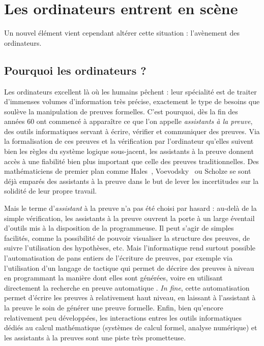 \section{Les ordinateurs entrent en scène}
\label{sec:assistants-preuve}

Un nouvel élément vient cependant altérer cette situation :
l’avènement des ordinateurs.

\subsection{Pourquoi les ordinateurs ?}

Les ordinateurs excellent là où les humains pêchent : leur spécialité est de traiter
d’immenses volumes d’information très précise, exactement le type
de besoins que soulève la manipulation de preuves formelles. C’est pourquoi, dès
la fin des années 60
ont commencé à apparaître ce que l’on appelle \emph{assistants à la
preuve}, des outils informatiques servant à écrire, vérifier et communiquer des
preuves.
Via la formalisation de ces preuves et la vérification par l’ordinateur qu’elles
suivent bien les règles du système logique sous-jacent, les assistants à la preuve
donnent accès à une fiabilité bien plus important que celle des preuves
traditionnelles. Des mathématiciens de premier plan comme
Hales~,
Voevodsky~\cite{??} ou
Scholze \cite{LiquidTensorExperiment}
se sont déjà emparés des assistants à la preuve dans le but de lever les incertitudes
sur la solidité de leur propre travail.

Mais le terme d’\emph{assistant} à la preuve n’a pas été choisi par hasard : au-delà
de la simple vérification, les assistants à la preuve ouvrent la porte à un large
éventail d’outils mis à la disposition de la programmeuse. Il peut s’agir de simples
facilités, comme la possibilité de pouvoir visualiser la structure des
preuves, de suivre l’utilisation des hypothèses, etc.
Mais l’informatique rend surtout possible l’automatisation de pans entiers
de l’écriture de preuves,
par exemple via l’utilisation d’un langage de tactique \cite{??} qui permet
de décrire des preuves à niveau en programmant la manière dont elles sont générées,
voire en utilisant directement la recherche en preuve automatique
\cite{Sledgehammer,SMTCoq}. \textit{In fine}, cette automatisation permet d’écrire
les preuves à relativement haut niveau, en laissant à l’assistant à la preuve le soin
de générer une preuve formelle.
Enfin, bien qu’encore relativement peu développées,
les interactions entres les outils informatiques dédiés au calcul mathématique
(systèmes de calcul formel, analyse numérique) et les assistants à la
preuves sont une piste très prometteuse.

